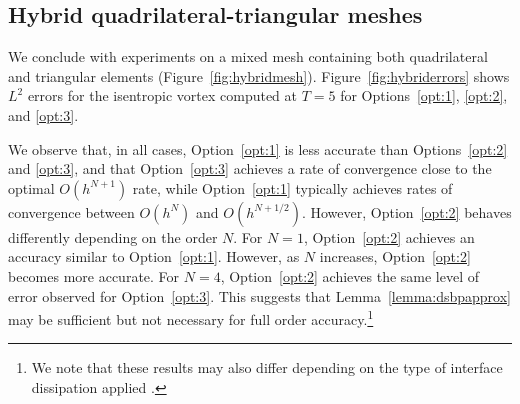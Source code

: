 \documentclass{svjour3}                     %
\begin{document}


\subsection{Hybrid quadrilateral-triangular meshes}

We conclude with experiments on a mixed mesh containing both quadrilateral and triangular elements (Figure~\ref{fig:hybridmesh}).  Figure~\ref{fig:hybriderrors} shows $L^2$ errors for the isentropic vortex computed at $T = 5$ for Options~\ref{opt:1}, \ref{opt:2}, and \ref{opt:3}.  

We observe that, in all cases, Option~\ref{opt:1} is less accurate than Options~\ref{opt:2} and \ref{opt:3}, and that Option~\ref{opt:3} achieves a rate of convergence close to the optimal $O(h^{N+1})$ rate, while Option~\ref{opt:1} typically achieves rates of convergence between $O(h^N)$ and $O(h^{N+1/2})$.  However, Option~\ref{opt:2} behaves differently depending on the order $N$.  For $N = 1$, Option~\ref{opt:2} achieves an accuracy similar to Option~\ref{opt:1}.  However, as $N$ increases, Option~\ref{opt:2} becomes more accurate.  For $N=4$, Option~\ref{opt:2} achieves the same level of error observed for Option~\ref{opt:3}.  This suggests that Lemma~\ref{lemma:dsbpapprox} may be sufficient but not necessary for full order accuracy.\footnote{We note that these results may also differ depending on the type of interface dissipation applied \cite{hindenlang2019order}.}  

\end{document}
